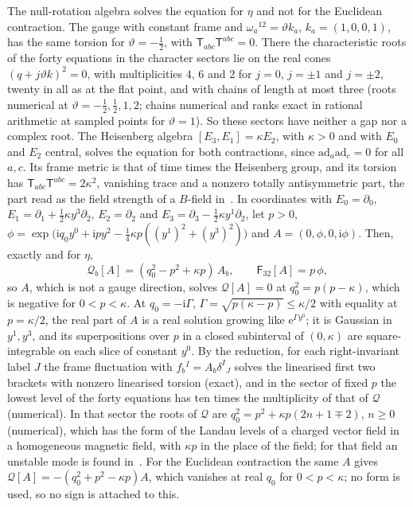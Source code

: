 The null-rotation algebra solves the equation for \(\eta\) and not for the Euclidean contraction. The gauge with constant frame and \(\omega_a{}^{12}=\vartheta k_a\), \(k_a=(1,0,0,1)\), has the same torsion for \(\vartheta=-\tfrac12\), with \(\mathsf T_{abc}\mathsf T^{abc}=0\). There the characteristic roots of the forty equations in the character sectors lie on the real cones \((q+j\vartheta k)^2=0\), with multiplicities \(4\), \(6\) and \(2\) for \(j=0\), \(j=\pm1\) and \(j=\pm2\), twenty in all as at the flat point, and with chains of length at most three (roots numerical at \(\vartheta=-\tfrac12,\tfrac12,1,2\); chains numerical and ranks exact in rational arithmetic at sampled points for \(\vartheta=1\)). So these sectors have neither a gap nor a complex root. The Heisenberg algebra \([E_3,E_1]=\kappa E_2\), with \(\kappa>0\) and with \(E_0\) and \(E_2\) central, solves the equation for both contractions, since \(\mathrm{ad}_a\mathrm{ad}_c=0\) for all \(a,c\). Its frame metric is that of time times the Heisenberg group, and its torsion has \(\mathsf T_{abc}\mathsf T^{abc}=2\kappa^2\), vanishing trace and a nonzero totally antisymmetric part, the part read as the field strength of a \(B\)-field in~\cite{FurutaHanadaKawaiKimura2007}. In coordinates with \(E_0=\partial_0\), \(E_1=\partial_1+\tfrac12\kappa y^3\partial_2\), \(E_2=\partial_2\) and \(E_3=\partial_3-\tfrac12\kappa y^1\partial_2\), let \(p>0\), \(\phi=\exp\bigl(\mathrm iq_0y^0+\mathrm ipy^2-\tfrac14\kappa p((y^1)^2+(y^3)^2)\bigr)\) and \(A=(0,\phi,0,\mathrm i\phi)\). Then, exactly and for \(\eta\),
\[
\mathcal Q_b[A]=(q_0^2-p^2+\kappa p)\,A_b,\qquad\mathsf F_{32}[A]=p\,\phi,
\]
so \(A\), which is not a gauge direction, solves \(\mathcal Q[A]=0\) at \(q_0^2=p(p-\kappa)\), which is negative for \(0<p<\kappa\). At \(q_0=-\mathrm i\Gamma\), \(\Gamma=\sqrt{p(\kappa-p)}\le\kappa/2\) with equality at \(p=\kappa/2\), the real part of \(A\) is a real solution growing like \(\mathrm e^{\Gamma y^0}\); it is Gaussian in \(y^1,y^3\), and its superpositions over \(p\) in a closed subinterval of \((0,\kappa)\) are square-integrable on each slice of constant \(y^0\). By the reduction, for each right-invariant label \(J\) the frame fluctuation with \(f_b{}^I=A_b\delta^I{}_J\) solves the linearised first two brackets with nonzero linearised torsion (exact), and in the sector of fixed \(p\) the lowest level of the forty equations has ten times the multiplicity of that of \(\mathcal Q\) (numerical). In that sector the roots of \(\mathcal Q\) are \(q_0^2=p^2+\kappa p(2n+1\mp2)\), \(n\ge0\) (numerical), which has the form of the Landau levels of a charged vector field in a homogeneous magnetic field, with \(\kappa p\) in the place of the field; for that field an unstable mode is found in~\cite{NielsenOlesen1978}. For the Euclidean contraction the same \(A\) gives \(\mathcal Q[A]=-(q_0^2+p^2-\kappa p)A\), which vanishes at real \(q_0\) for \(0<p<\kappa\); no form is used, so no sign is attached to this.

